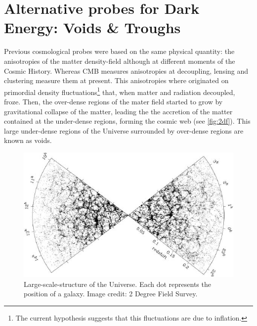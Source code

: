 \section{Alternative probes for Dark Energy: Voids \& Troughs}
Previous cosmological probes were based on the same physical quantity: the anisotropies of the matter density-field although at different moments of the Cosmic History. Whereas CMB measures anisotropies at decoupling, lensing and clustering measure them at present. This anisotropies where originated on primordial density fluctuations\footnote{The current hypothesis suggests that this fluctuations are due to inflation.} that, when matter and radiation decoupled, froze. Then, the over-dense regions of the mater field started to grow by gravitational collapse of the matter, leading the the accretion of the matter contained at the under-dense regions, forming the cosmic  web (see \autoref{fig:2df}). This large under-dense regions of the Universe surrounded by over-dense regions are known as voids.
\begin{figure}
\includegraphics[width=\textwidth]{./Pictures/2df.jpg}
\caption{Large-scale-structure of the Universe. Each dot represents the position of a galaxy. Image credit: 2 Degree Field Survey.}
\label{fig:2df}
\end{figure}
\newline

